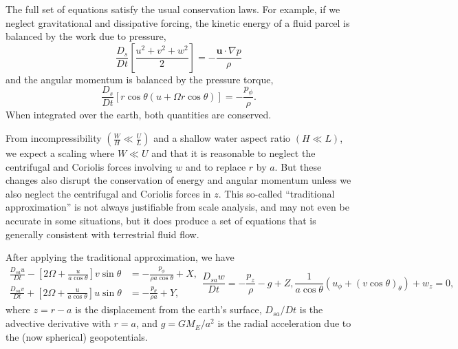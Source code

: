 \documentclass[11pt]{article}
\begin{document}
The full set of equations satisfy the usual conservation laws. For example, if we neglect gravitational and dissipative forcing, the kinetic energy of a fluid parcel is balanced by the work due to pressure, 
\begin{equation}
\label{FullKineticEnergy}
\frac{D_s}{Dt} \left[\frac{u^2 + v^2 + w^2}{2} \right] = - \frac{\textbf{u} \cdot \nabla p}{\rho}
\end{equation}
and the angular momentum is balanced by the pressure torque,
\begin{equation}
\label{FullAngularMomentum}
\frac{D_s}{Dt} \left[r \cos \theta \left(u + \Omega r \cos \theta \right) \right] = - \frac{p_\phi}{\rho}.
\end{equation}
When integrated over the earth, both quantities are conserved.

From incompressibility $\left(\frac{W}{H} \ll \frac{U}{L}\right)$ and a shallow water aspect ratio $(H \ll L)$, we expect a scaling where $W \ll U$ and that it is reasonable to neglect the centrifugal and Coriolis forces involving $w$ and to replace $r$ by $a$. But these changes also disrupt the conservation of energy and angular momentum unless we also neglect the centrifugal and Coriolis forces in $z$. This so-called ``traditional approximation'' is not always justifiable from scale analysis, and may not even be accurate in some situations, but it does produce a set of equations that is generally consistent with terrestrial fluid flow. 

After applying the traditional approximation, we have
\begin{subequations}
\begin{align}
\frac{D_{sa} u}{Dt} - \left[2\Omega + \frac{u}{a \cos \theta} \right] v \sin \theta &= - \frac{p_\phi}{\rho a \cos\theta} + X, \\
\frac{D_{sa} v}{Dt} + \left[2\Omega + \frac{u}{a \cos\theta} \right] u \sin\theta &= - \frac{p_{\theta}}{\rho a} + Y,
\end{align}
\begin{equation}
\frac{D_{sa} w}{Dt} = - \frac{p_z}{\rho} - g + Z,
\end{equation}
\begin{equation}
\frac{1}{a \cos\theta}\left(u_{\phi} + \left(v \cos\theta \right)_{\theta} \right) + w_z =0,
\end{equation}
\end{subequations}
where $z = r-a$ is the displacement from the earth's surface, $D_{sa}/Dt$ is the advective derivative with $r=a$, and $g = G M_E / a^2$ is the radial acceleration due to the (now spherical) geopotentials.
\end{document}
